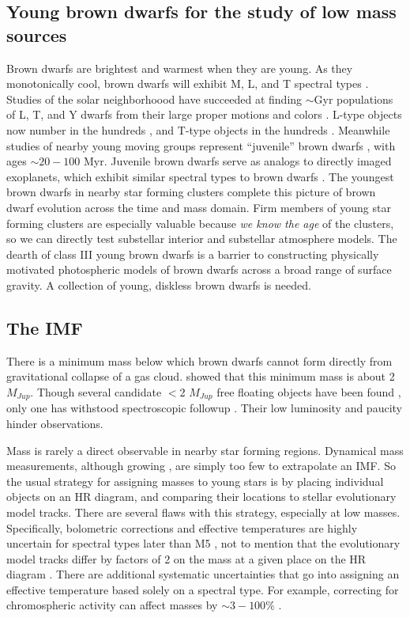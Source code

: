 \documentclass[12pt,preprint]{aastex}
\begin{document}
\subsection{Young brown dwarfs for the study of low mass sources}
Brown dwarfs are brightest and warmest when they are young.  As they monotonically cool, brown dwarfs will exhibit M, L, and T spectral types \citep{2012ApJS..201...19D}.  Studies of the solar neighborhoood have succeeded at finding $\sim$Gyr populations of L, T, and Y dwarfs from their large proper motions and colors \citep{2011ApJS..197...19K}.  L-type objects now number in the hundreds \citep{2010AJ....139.1808S}, and T-type objects in the hundreds \citep{2011ApJS..197...19K}.  Meanwhile studies of nearby young moving groups represent ``juvenile'' brown dwarfs \citep{2013ApJ...772...79A}, with ages $\sim20-100$ Myr.  Juvenile brown dwarfs serve as analogs to directly imaged exoplanets, which exhibit similar spectral types to brown dwarfs \citep{2015ApJ...798L...3C}.  The youngest brown dwarfs in nearby star forming clusters complete this picture of brown dwarf evolution across the time and mass domain.  Firm members of young star forming clusters are especially valuable because \emph{we know the age} of the clusters, so we can directly test substellar interior and substellar atmosphere models.  The dearth of class III young brown dwarfs is a barrier to constructing physically motivated photospheric models of brown dwarfs across a broad range of surface gravity.  A collection of young, diskless brown dwarfs is needed.

\subsection{The IMF}

There is a minimum mass below which brown dwarfs cannot form directly from gravitational collapse of a gas cloud.  \citet{1976MNRAS.176..483R} showed that this minimum mass is about 2 $M_{Jup}$.  Though several candidate $<$2 $M_{Jup}$ free floating objects have been found \citep{2015A&A...574A.118P}, only one has withstood spectroscopic followup \citep{2010ApJ...709L.158M}.  Their low luminosity and paucity hinder observations.

Mass is rarely a direct observable in nearby star forming regions.  Dynamical mass measurements, although growing \citep{2010ApJ...721.1725D}, are simply too few to extrapolate an IMF.  So the usual strategy for assigning masses to young stars is by placing individual objects on an HR diagram, and comparing their locations to stellar evolutionary model tracks.  There are several flaws with this strategy, especially at low masses.  Specifically, bolometric corrections and effective temperatures are highly uncertain for spectral types later than M5 \citep{2013ApJS..208....9P}, not to mention that the evolutionary model tracks differ by factors of 2 on the mass at a given place on the HR diagram \citep{1994ApJS...90..467D,1998A&A...337..403B}.  There are additional systematic uncertainties that go into assigning an effective temperature based solely on a spectral type.  For example, correcting for chromospheric activity can affect masses by $\sim3-100\%$ \citep{2014ApJ...796..119S}.
\end{document}
